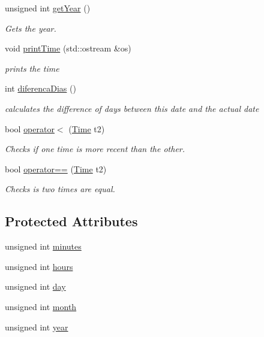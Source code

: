 \begin{DoxyCompactItemize}
unsigned int \hyperlink{classTime_ade4d01d38041bb86a2e1ded9fd3cd28e}{get\+Year} ()
\begin{DoxyCompactList}\small\item\em Gets the year. \end{DoxyCompactList}\item 
void \hyperlink{classTime_a79d96e150ff808580fdf43932897130d}{print\+Time} (std\+::ostream \&os)
\begin{DoxyCompactList}\small\item\em prints the time \end{DoxyCompactList}\item 
int \hyperlink{classTime_a346c1dbc706dfd41e4a15b16577e4265}{diferenca\+Dias} ()
\begin{DoxyCompactList}\small\item\em calculates the difference of days between this date and the actual date \end{DoxyCompactList}\item 
bool \hyperlink{classTime_a36e9d3c27e0f42d2d83f9831dcc4a670}{operator$<$} (\hyperlink{classTime}{Time} t2)
\begin{DoxyCompactList}\small\item\em Checks if one time is more recent than the other. \end{DoxyCompactList}\item 
bool \hyperlink{classTime_af7141e492faaa66dcde703ff3ee9c9f7}{operator==} (\hyperlink{classTime}{Time} t2)
\begin{DoxyCompactList}\small\item\em Checks is two times are equal. \end{DoxyCompactList}\end{DoxyCompactItemize}
\subsection*{Protected Attributes}
\begin{DoxyCompactItemize}
\item 
unsigned int \hyperlink{classTime_ab9da5c3324d296464bf26131fd5d8c3f}{minutes}
\item 
unsigned int \hyperlink{classTime_a08e7d6202b1fe8c01c25bf6688d41712}{hours}
\item 
unsigned int \hyperlink{classTime_a9e8b7d2c0e22ab2b87a5870d0492e508}{day}
\item 
unsigned int \hyperlink{classTime_a6076ed85da3f1d76e8c5d014ae239748}{month}
\item 
unsigned int \hyperlink{classTime_ae2f1e52f8d00060a7cf7376927d65994}{year}
\end{DoxyCompactItemize}


